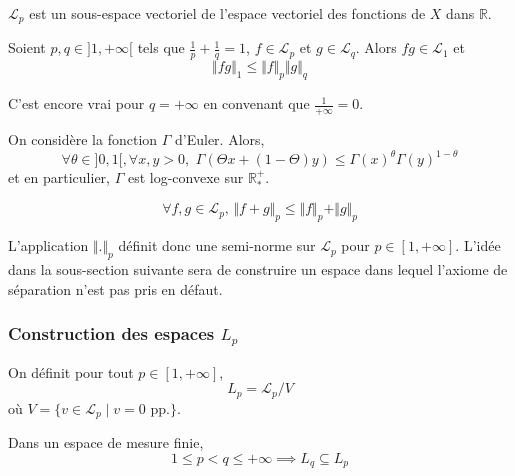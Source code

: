   \begin{proposition}
    $\mathcal{L}_p$ est un sous-espace vectoriel de l'espace vectoriel des fonctions de $X$ dans $\mathbb{R}$.
  \end{proposition}


  \begin{theorem}
    Soient $p, q \in ]1, +\infty[$ tels que $\frac{1}{p} + \frac{1}{q} = 1$, $f \in \mathcal{L}_p$ et $g \in \mathcal{L}_q$. Alors $fg \in \mathcal{L}_1$ et
    \[ \Vert fg \Vert_1 \leq \Vert f \Vert_p \Vert g \Vert_q \]
  \end{theorem}

  \begin{remark}
    C'est encore vrai pour $q = +\infty$ en convenant que $\frac{1}{+\infty} = 0$.
  \end{remark}

  \begin{application}
    On considère la fonction $\Gamma$ d'Euler. Alors,
    \[ \forall \theta \in ]0,1[, \forall x, y > 0, \, \, \Gamma(\Theta x + (1 - \Theta)y) \leq \Gamma(x)^{\theta} \Gamma(y)^{1 - \theta} \]
    et en particulier, $\Gamma$ est log-convexe sur $\mathbb{R}^+_*$.
  \end{application}

  \begin{theorem}
    \[ \forall f, g \in \mathcal{L}_p, \, \Vert f + g \Vert_p \leq \Vert f \Vert_p + \Vert g \Vert_p \]
  \end{theorem}

  L'application $\Vert . \Vert_p$ définit donc une semi-norme sur $\mathcal{L}_p$ pour $p \in [1, +\infty]$. L'idée dans la sous-section suivante sera de construire un espace dans lequel l'axiome de séparation n'est pas pris en défaut.

  \subsubsection{Construction des espaces \texorpdfstring{$L_p$}{Lp}}

  \begin{definition}
    On définit pour tout $p \in [1, +\infty]$,
    \[ L_p = \mathcal{L}_p / V \]
    où $V = \{ v \in \mathcal{L}_p \mid v = 0 \text{ pp.} \}$.
  \end{definition}

  \begin{proposition}
    Dans un espace de mesure finie,
    \[ 1 \leq p < q \leq +\infty \implies L_q \subseteq L_p \]
  \end{proposition}

